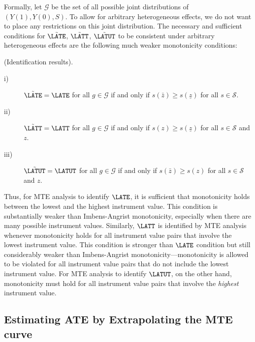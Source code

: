 Formally, let $\mathcal{G}$ be the set of all possible joint distributions
of $\left(Y\left(1\right),Y\left(0\right),S\right)$. To allow for
arbitrary heterogeneous effects, we do not want to place any restrictions
on this joint distribution. The necessary and sufficient conditions
for $\tilde{\LATE}$, $\tilde{\LATT}$, $\tilde{\LATUT}$ to be consistent
under arbitrary heterogeneous effects are the following much weaker
monotonicity conditions:
\begin{thm}
\label{thm:id1} (Identification results).
\end{thm}
\begin{description}
\item [{i)}] $\tilde{\LATE}=\LATE$ for all $g\in\mathcal{G}$ if and only
if $s\left(\bar{z}\right)\geq s\left(\underline{z}\right)$ for all
$s\in\mathcal{S}$.
\item [{ii)}] $\tilde{\LATT}=\LATT$ for all $g\in\mathcal{G}$ if and
only if $s\left(z\right)\geq s\left(\underline{z}\right)$ for all
$s\in\mathcal{S}$ and $z$.
\item [{iii)}] $\tilde{\LATUT}=\LATUT$ for all $g\in\mathcal{G}$ if and
only if $s\left(\bar{z}\right)\geq s\left(z\right)$ for all $s\in\mathcal{S}$
and $z$.
\end{description}
Thus, for MTE analysis to identify $\LATE$, it is sufficient that
monotonicity holds between the lowest and the highest instrument value.
This condition is substantially weaker than Imbens-Angrist monotonicity,
especially when there are many possible instrument values. Similarly,
$\LATT$ is identified by MTE analysis whenever monotonicity holds
for all instrument value pairs that involve the lowest instrument
value. This condition is stronger than $\LATE$ condition but still
considerably weaker than Imbens-Angrist monotonicity---monotonicity
is allowed to be violated for all instrument value pairs that do not
include the lowest instrument value. For MTE analysis to identify
$\LATUT$, on the other hand, monotonicity must hold for all instrument
value pairs that involve the \emph{highest} instrument value.

\subsection{Estimating ATE by Extrapolating the MTE curve}

